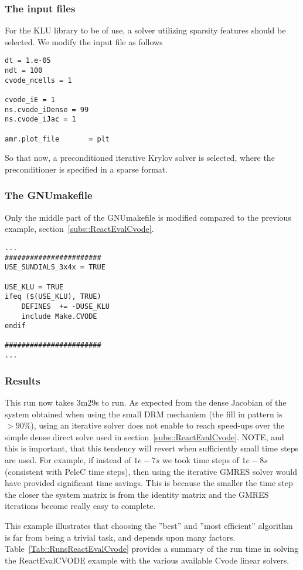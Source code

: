 \documentclass[12pt]{article}
\begin{document}
\subsubsection{The input files}
For the KLU library to be of use, a solver utilizing sparsity features should be selected. We modify the input file as follows
\begin{verbatim}
dt = 1.e-05  
ndt = 100
cvode_ncells = 1

cvode_iE = 1
ns.cvode_iDense = 99
ns.cvode_iJac = 1

amr.plot_file       = plt
\end{verbatim}
So that now, a preconditioned iterative Krylov solver is selected, where the preconditioner is specified in a sparse format.

\subsubsection{The GNUmakefile}
Only the middle part of the GNUmakefile is modified compared to the previous example, section~\ref{subs::ReactEvalCvode}.
\begin{verbatim}
...
#######################
USE_SUNDIALS_3x4x = TRUE

USE_KLU = TRUE
ifeq ($(USE_KLU), TRUE)
    DEFINES  += -DUSE_KLU
    include Make.CVODE
endif

#######################
...
\end{verbatim}

\subsubsection{Results}
This run now takes 3m29s to run. As expected from the dense Jacobian of the system obtained when using the small DRM mechanism (the fill in pattern is $>90 \%$), using an iterative solver does not enable to reach speed-ups over the simple dense direct solve used in section~\ref{subs::ReactEvalCvode}. NOTE, and this is important, that this tendency will revert when sufficiently small time steps are used. For example, if instead of $1e-7s$ we took time steps of $1e-8s$ (consistent with PeleC time steps), then using the iterative GMRES solver would have provided significant time savings. This is because the smaller the time step the closer the system matrix is from the identity matrix and the GMRES iterations become really easy to complete.

This example illustrates that choosing the ''best'' and ''most efficient'' algorithm is far from being a trivial task, and depends upon many factors. Table~\ref{Tab::RunsReactEvalCvode} provides a summary of the run time in solving the ReactEvalCVODE example with the various available Cvode linear solvers.
\end{document}
